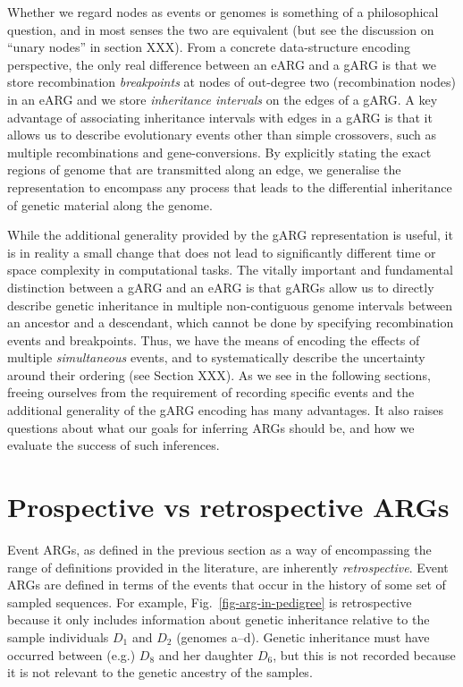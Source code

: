 \documentclass{article}
\begin{document}
Whether we regard nodes as events or genomes is something of a
philosophical question, and in most senses the two are equivalent
(but see the discussion on ``unary nodes'' in section XXX).
From a concrete data-structure encoding perspective, the only real
difference between an eARG and a gARG is that we store recombination
\emph{breakpoints} at nodes of out-degree two (recombination nodes)
in an eARG and we store \emph{inheritance intervals} on the edges
of a gARG. A key advantage of associating inheritance intervals with
edges in a gARG is that it allows us to describe evolutionary events other
than simple crossovers, such as multiple recombinations and
gene-conversions. By explicitly stating the exact regions of genome
that are transmitted along an edge, we generalise the representation
to encompass any process that leads to the differential inheritance of
genetic material along the genome.

While the additional generality provided by the gARG representation
is useful, it is in reality a small change that does not
lead to significantly different time or space complexity in computational
tasks.
The vitally important and fundamental distinction between
a gARG and an eARG is that gARGs
allow us to directly describe
genetic inheritance in multiple non-contiguous genome intervals
between an ancestor and a descendant, which cannot be done
by specifying recombination events and breakpoints.
Thus, we have the means of encoding the effects of
multiple \emph{simultaneous} events, and to
systematically describe the uncertainty around their
ordering (see Section XXX).
As we see in the following sections, freeing ourselves from the requirement
of recording specific events and
the additional generality of the gARG encoding
has many advantages. It also raises questions about what our goals
for inferring ARGs should be, and how we evaluate the success
of such inferences.

\section*{Prospective vs retrospective ARGs}
Event ARGs, as defined in the previous section as a way of encompassing
the range of definitions provided in the literature, are
inherently \emph{retrospective}.
Event ARGs are defined in terms
of the events that occur in the history of some set of sampled
sequences.
For example, Fig.~\ref{fig-arg-in-pedigree}
is retrospective because it only includes information
about genetic inheritance relative to the sample individuals
$D_1$ and $D_2$ (genomes \textsf{a}--\textsf{d}).
Genetic inheritance must have occurred between (e.g.)
$D_8$ and her daughter $D_6$, but this is not recorded because
it is not relevant to the genetic ancestry of the samples.
\end{document}
